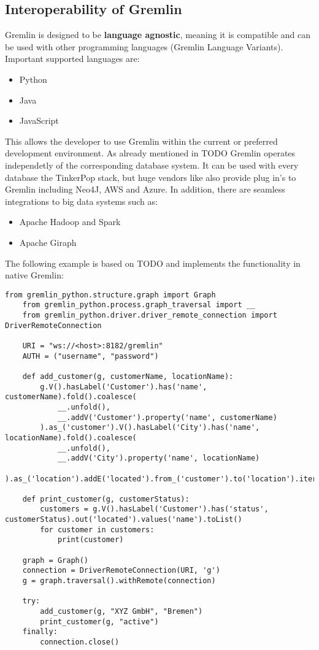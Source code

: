 \subsection{Interoperability of Gremlin}
\label{subsec:different_query_languages_for_graph_databases:gremlin:interoperability}
Gremlin is designed to be \textbf{language agnostic}, meaning it is compatible and
can be used with other programming languages (Gremlin Language Variants).
Important supported languages are:
\begin{itemize}
	\item Python
	\item Java
	\item JavaScript
\end{itemize}
This allows the developer to use Gremlin within the current or preferred 
development environment.
As already mentioned in TODO Gremlin operates independetly of the corresponding
database system. It can be used with every database the TinkerPop stack, but huge
vendors like also provide plug in's to Gremlin including Neo4J, AWS and Azure.
In addition, there are seamless integrations to big data systems such as:
\begin{itemize}
	\item Apache Hadoop and Spark
	\item Apache Giraph
\end{itemize}
The following example is based on TODO and implements the functionality in native Gremlin:
\begin{lstlisting}[caption={Interact with Gremlin via Python}, label={lst:pythonAndGremlin}]
	from gremlin_python.structure.graph import Graph
	from gremlin_python.process.graph_traversal import __
	from gremlin_python.driver.driver_remote_connection import DriverRemoteConnection

	URI = "ws://<host>:8182/gremlin"
	AUTH = ("username", "password")

	def add_customer(g, customerName, locationName):
		g.V().hasLabel('Customer').has('name', customerName).fold().coalesce(
			__.unfold(),
			__.addV('Customer').property('name', customerName)
		).as_('customer').V().hasLabel('City').has('name', locationName).fold().coalesce(
			__.unfold(),
			__.addV('City').property('name', locationName)
		).as_('location').addE('located').from_('customer').to('location').iterate()

	def print_customer(g, customerStatus):
		customers = g.V().hasLabel('Customer').has('status', customerStatus).out('located').values('name').toList()
		for customer in customers:
			print(customer)

	graph = Graph()
	connection = DriverRemoteConnection(URI, 'g')
	g = graph.traversal().withRemote(connection)

	try:
		add_customer(g, "XYZ GmbH", "Bremen")
		print_customer(g, "active")
	finally:
		connection.close()
\end{lstlisting}

